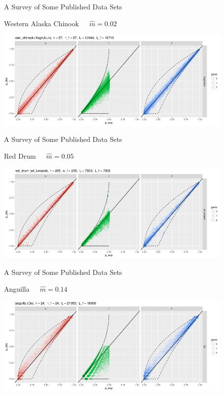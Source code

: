 \documentclass[letter,graphicx]{beamer}
\begin{document}
\begin{frame}{A Survey of Some Published Data Sets}

\begin{center}
Western Alaska Chinook~~~$\hat{m} = 0.02$
\vspace*{1.5em}

\includegraphics[width=0.87\textwidth]{./images/wak_chinook_big_pop.png}
\end{center}
\end{frame}





\begin{frame}{A Survey of Some Published Data Sets}

\begin{center}
Red Drum~~~$\hat{m} = 0.05$
\vspace*{1.5em}

\includegraphics[width=0.87\textwidth]{./images/red_drum_big_pop.png}
\end{center}
\end{frame}






\begin{frame}{A Survey of Some Published Data Sets}

\begin{center}
Anguilla~~~$\hat{m} = 0.14$
\vspace*{1.5em}

\includegraphics[width=0.87\textwidth]{./images/anguilla_big_pop.png}
\end{center}
\end{frame}
\end{document}

